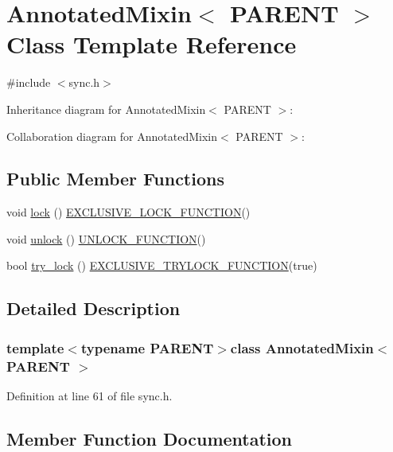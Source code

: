 \hypertarget{class_annotated_mixin}{}\section{Annotated\+Mixin$<$ P\+A\+R\+E\+N\+T $>$ Class Template Reference}
\label{class_annotated_mixin}


{\ttfamily \#include $<$sync.\+h$>$}



Inheritance diagram for Annotated\+Mixin$<$ P\+A\+R\+E\+N\+T $>$\+:


Collaboration diagram for Annotated\+Mixin$<$ P\+A\+R\+E\+N\+T $>$\+:
\subsection*{Public Member Functions}
\begin{DoxyCompactItemize}
\item 
void \hyperlink{class_annotated_mixin_ad1f35c6d1b8a8e980fff45e7e7cb46d3}{lock} () \hyperlink{threadsafety_8h_a77729163b7f6867da40ad5daa5f926f3}{E\+X\+C\+L\+U\+S\+I\+V\+E\+\_\+\+L\+O\+C\+K\+\_\+\+F\+U\+N\+C\+T\+I\+O\+N}()
\item 
void \hyperlink{class_annotated_mixin_acc2e3da37c2d9dd483b859572e32bc24}{unlock} () \hyperlink{threadsafety_8h_abd56e19f9b4781b1a5212a46951cf5c3}{U\+N\+L\+O\+C\+K\+\_\+\+F\+U\+N\+C\+T\+I\+O\+N}()
\item 
bool \hyperlink{class_annotated_mixin_a9a33deab2da56790d8b5d30b1fd8350d}{try\+\_\+lock} () \hyperlink{threadsafety_8h_a3c67d370ed1f55064d85e01076aad534}{E\+X\+C\+L\+U\+S\+I\+V\+E\+\_\+\+T\+R\+Y\+L\+O\+C\+K\+\_\+\+F\+U\+N\+C\+T\+I\+O\+N}(true)
\end{DoxyCompactItemize}


\subsection{Detailed Description}
\subsubsection*{template$<$typename P\+A\+R\+E\+N\+T$>$class Annotated\+Mixin$<$ P\+A\+R\+E\+N\+T $>$}



Definition at line 61 of file sync.\+h.



\subsection{Member Function Documentation}
\hypertarget{class_annotated_mixin_ad1f35c6d1b8a8e980fff45e7e7cb46d3}{}
